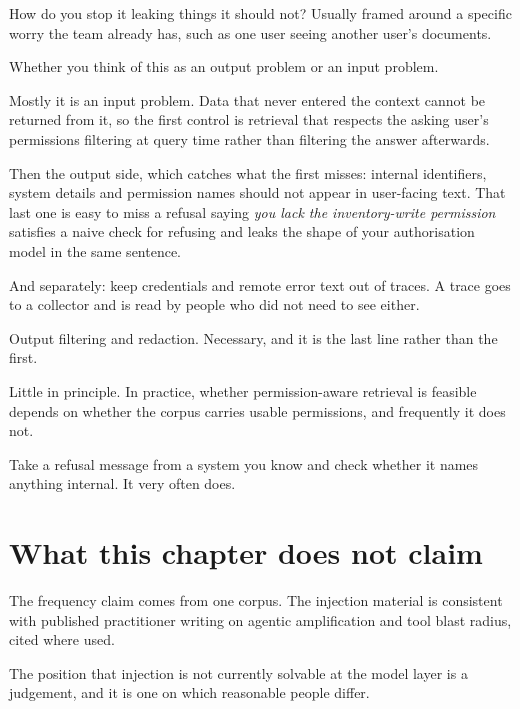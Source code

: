 \begin{bankq}{How do you stop it leaking things it should not?}
\qasked
Usually framed around a specific worry the team already has, such as one
user seeing another user's documents.

\qtested
Whether you think of this as an output problem or an input problem.

\qstaff
Mostly it is an input problem. Data that never entered the context cannot be
returned from it, so the first control is retrieval that respects the asking
user's permissions \dash{} filtering at query time rather than filtering the
answer afterwards.

Then the output side, which catches what the first misses: internal
identifiers, system details and permission names should not appear in
user-facing text. That last one is easy to miss \dash{} a refusal saying
\emph{you lack the inventory-write permission} satisfies a naive check for
refusing and leaks the shape of your authorisation model in the same sentence.

And separately: keep credentials and remote error text out of traces. A trace
goes to a collector and is read by people who did not need to see either.

\qsenior
Output filtering and redaction. Necessary, and it is the last line rather than
the first.

\qcontested
Little in principle. In practice, whether permission-aware retrieval is
feasible depends on whether the corpus carries usable permissions, and
frequently it does not.

\qdrill
Take a refusal message from a system you know and check whether it names
anything internal. It very often does.
\end{bankq}

\section*{What this chapter does not claim}

The frequency claim comes from one corpus. The injection material is consistent
with published practitioner writing on agentic amplification and tool blast
radius, cited where used.

The position that injection is not currently solvable at the model layer is a
judgement, and it is one on which reasonable people differ.
